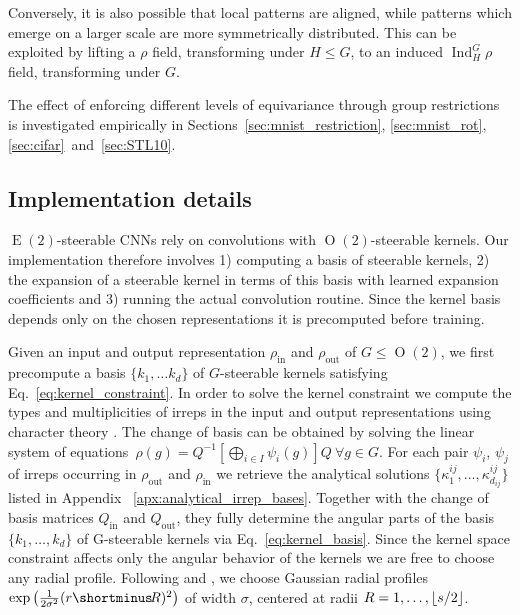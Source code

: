 \documentclass{article}
\newcommand{\apx}{Appendix\xspace
}
\newcommand{\E}[1]{\ensuremath{\operatorname{E}(#1)}}
\renewcommand{\O}[1]{\ensuremath{\operatorname{O}(#1)}}
\newcommand{\Ind}[2]{\ensuremath{\operatorname{Ind}_{#1}^{#2}}}
\DeclarePairedDelimiter{\floor}{\lfloor}{\rfloor}
\newlength{\secBefore}
\newlength{\secAfter}
\newlength{\subsecBefore}
\newlength{\subsecAfter}
\begin{document}
Conversely, it is also possible that local patterns are aligned, while patterns which emerge on a larger scale are more symmetrically distributed.
This can be exploited by lifting a $\rho$ field, transforming under $H\leq G$,
to an induced $\Ind{H}{G}\rho$ field, transforming under $G$.

The effect of enforcing different levels of equivariance through group restrictions is investigated empirically in Sections~\ref{sec:mnist_restriction}, \ref{sec:mnist_rot}, \ref{sec:cifar}~and~\ref{sec:STL10}.

 	
\vspace*{\subsecBefore}
\subsection{Implementation details}
\label{sec:implementation}
\vspace*{\subsecAfter}


$\E2$-steerable CNNs rely on convolutions with $\O2$-steerable kernels.
Our implementation therefore involves 1) computing a basis of steerable kernels, 2) the expansion of a steerable kernel in terms of this basis with learned expansion coefficients and 3) running the actual convolution routine.
Since the kernel basis depends only on the chosen representations it is precomputed before training.


Given an input and output representation $\rho_\text{in}$ and $\rho_\text{out}$ of $G\leq\O2$, we first precompute a basis $\{k_1,\dots k_d\}$ of $G$-steerable kernels satisfying Eq.~\eqref{eq:kernel_constraint}.
In order to solve the kernel constraint we compute the types and multiplicities of irreps in the input and output representations using character theory \cite{serre1977linear}.
The change of basis can be obtained by solving the linear system of
\mbox{equations $\rho(g)=Q^{-1}[\bigoplus_{i\in I}\psi_i(g)]Q\ \forall g\in G$.}
For each pair $\psi_i$, $\psi_j$ of irreps occurring in $\rho_\text{out}$ and $\rho_\text{in}$ we retrieve the analytical solutions $\{\kappa^{ij}_1,\dots,\kappa^{ij}_{d_{ij}}\}$ listed in \apx~\ref{apx:analytical_irrep_bases}.
Together with the change of basis matrices $Q_\text{in}$ and $Q_\text{out}$, they fully determine the angular parts of the basis $\{k_1,\dots,k_d\}$ of G-steerable kernels via Eq.~\eqref{eq:kernel_basis}.
Since the kernel space constraint affects only the angular behavior of the kernels we are free to choose any radial profile.
Following \cite{Weiler2018-STEERABLE} and \cite{3d_steerableCNNs}, we choose Gaussian radial profiles $\exp\left(\frac{1}{2\sigma^2}(r\shortminus\!R)^2\right)$ of width $\sigma$, centered at radii $R=1,\dots,\floor{s/2}$.
\end{document}
